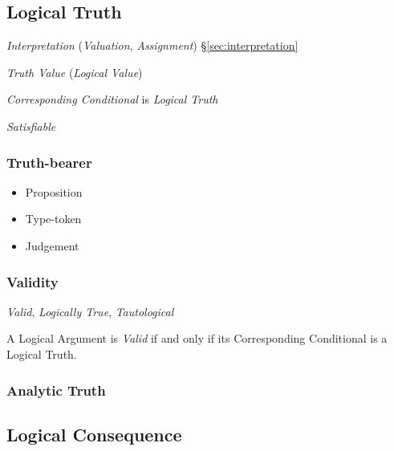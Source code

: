 \subsection{Logical Truth}\label{sec:logical_truth}

\emph{Interpretation} (\emph{Valuation}, \emph{Assignment})
\S\ref{sec:interpretation}

\emph{Truth Value} (\emph{Logical Value})

\emph{Corresponding Conditional} is \emph{Logical Truth}

\emph{Satisfiable}



\subsubsection{Truth-bearer}\label{sec:truth_bearer}

\begin{itemize}
\item Proposition
\item Type-token
\item Judgement
\end{itemize}



\subsubsection{Validity}\label{sec:validity}

\emph{Valid}, \emph{Logically True}, \emph{Tautological}

A Logical Argument is \emph{Valid} if and only if its
Corresponding Conditional is a Logical Truth.



\subsubsection{Analytic Truth}\label{sec:analytic_truth}



\subsection{Logical Consequence}\label{sec:logical_consequence}
\cite{beall-restall05}

